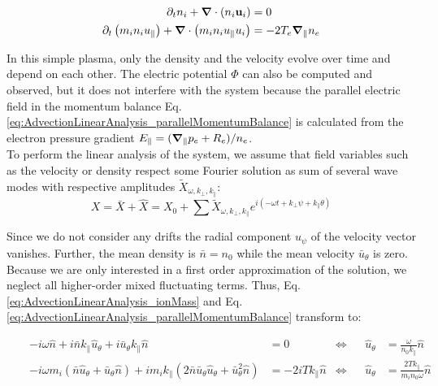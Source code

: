 \begin{align}
	\partial_t n_i + \grad\cdot\left(n_i\mathbf{u}_i\right) &= 0 \label{eq:AdvectionLinearAnalysis_ionMass} \\
	\partial_t \left(m_in_iu_\parallel\right) + \grad\cdot\left(m_in_iu_\parallel u_i\right) &= -2T_e\grad_\parallel n_e \label{eq:AdvectionLinearAnalysis_parallelMomentumBalance}
\end{align}

In this simple plasma, only the density and the velocity evolve over time and depend on each other. The electric potential $\Phi$ can also be computed and observed, but it does not interfere with the system because the parallel electric field in the momentum balance Eq. \ref{eq:AdvectionLinearAnalysis_parallelMomentumBalance} is calculated from the electron pressure gradient $E_\parallel = (\grad_\parallel p_e + R_e) / n_e$. \\

To perform the linear analysis of the system, we assume that field variables such as the velocity or density respect some Fourier solution as sum of several wave modes with respective amplitudes $\tilde{X}_{\omega,k_\perp,k_\parallel}$:
\begin{equation}
	 X = \bar{X} + \hat{X} = X_0 + \sum\tilde{X}_{\omega,k_\perp,k_\parallel}e^{i(-\omega t + k_\perp \psi + k_\parallel \theta)} \label{eq:FourierModeSolution}
\end{equation}

Since we do not consider any drifts the radial component $u_\psi$ of the velocity vector vanishes. Further, the mean density is $\bar{n}=n_0$ while the mean velocity $\bar{u}_\theta$ is zero. Because we are only interested in a first order approximation of the solution, we neglect all higher-order mixed fluctuating terms. Thus, Eq. \ref{eq:AdvectionLinearAnalysis_ionMass} and Eq. \ref{eq:AdvectionLinearAnalysis_parallelMomentumBalance} transform to:

\begin{align*}
	&&-i\omega\hat{n} + i\bar{n}k_\parallel\hat{u}_\theta + i\bar{u}_\theta k_\parallel\hat{n} &= 0 &\Leftrightarrow&& \hat{u}_\theta &= \frac{\omega}{n_0k_\parallel}\hat{n} \\
	&& -i\omega m_i \left(\bar{n}\hat{u}_\theta + \bar{u}_\theta\hat{n}\right) + im_ik_\parallel\left(2\bar{n}\bar{u}_\theta\hat{u}_\theta + \bar{u}_\theta^2\hat{n}\right) &= -2iT k_\parallel\hat{n}	&\Leftrightarrow&&  \hat{u}_\theta &= \frac{2T k_\parallel}{m_in_0\omega}\hat{n}
\end{align*}

